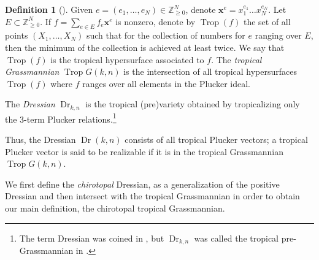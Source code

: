 \documentclass[pdftex]{sigma}
\theoremstyle{definition}
\newtheorem{defn}[thm]{Definition}
\numberwithin{equation}{section}
\begin{document}
\begin{defn}[\cite{speyer2004tropical}]
 Given $e = (e_1,\dots, e_N) \in \mathbb{Z}_{\ge 0}^N$, denote $\mathbf{x}^e = x_1^{e_1}\dots x_N^{e_N}$. Let $E \subset\mathbb{Z}^N_{\ge 0}$. If $f = \sum_{e\in E} f_e \mathbf{x}^e$ is nonzero, denote by $\operatorname{Trop} (f)$ the set of all points $(X_1,\dots, X_N)$ such that for the collection of numbers  for $e$ ranging over $E$, then the minimum of the collection is achieved at least twice. We say that $\operatorname{Trop} (f)$ is the tropical hypersurface associated to $f$. The \emph{tropical Grassmannian} $\operatorname{Trop} G(k,n)$ is the intersection of all tropical hypersurfaces $\operatorname{Trop} (f)$ where $f$ ranges over all elements in the Plucker ideal.

 The \emph{Dressian} $\operatorname{Dr}_{k,n}$ is the tropical (pre)variety obtained by tropicalizing only the 3-term Plucker relations.\footnote{The term Dressian was coined in \cite{herrmann2008draw}, but $\operatorname{Dr}_{k,n}$ was called the tropical pre-Grassmannian in \cite{speyer2004tropical}.}
\end{defn}

Thus, the Dressian $\operatorname{Dr}(k,n)$ consists of all tropical Plucker vectors; a tropical Plucker vector is said to be realizable if it is in the tropical Grassmannian $\operatorname{Trop}G(k,n)$.

We first define the \textit{chirotopal} Dressian, as a generalization of the positive Dressian and then intersect with the tropical Grassmannian in order to obtain our main definition, the chirotopal tropical Grassmannian.
\end{document}
